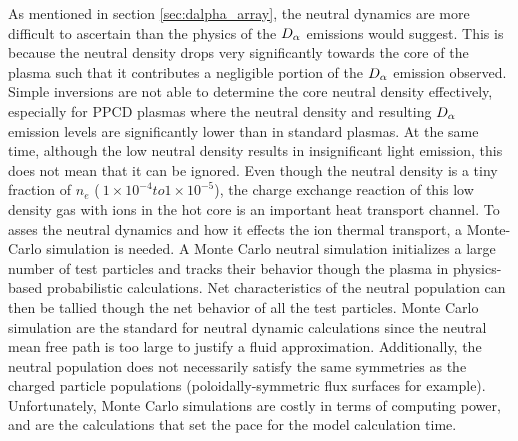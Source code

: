 As mentioned in section \ref{sec:dalpha_array}, the neutral dynamics are more difficult to ascertain than the physics of the $D_{\alpha}$ emissions would suggest. This is because the neutral density drops very significantly towards the core of the plasma such that it contributes a negligible portion of the $D_{\alpha}$ emission observed. Simple inversions are not able to determine the core neutral density effectively, especially for PPCD plasmas where the neutral density and resulting $D_{\alpha}$ emission levels are significantly lower than in standard plasmas. At the same time, although the low neutral density results in insignificant light emission, this does not mean that it can be ignored. Even though the neutral density is a tiny fraction of $n_e$ ($~1\times 10^{-4} to 1\times 10^{-5}$), the charge exchange reaction of this low density gas with ions in the hot core is an important heat transport channel. To asses the neutral dynamics and how it effects the ion thermal transport, a Monte-Carlo simulation is needed. A Monte Carlo neutral simulation initializes a large number of test particles and tracks their behavior though the plasma in physics-based probabilistic calculations. Net characteristics of the neutral population can then be tallied though the net behavior of all the test particles. Monte Carlo simulation are the standard for neutral dynamic calculations since the neutral mean free path is too large to justify a fluid approximation. Additionally, the neutral population does not necessarily satisfy the same symmetries as the charged particle populations (poloidally-symmetric flux surfaces for example). Unfortunately, Monte Carlo simulations are costly in terms of computing power, and are the calculations that set the pace for the model calculation time. 

